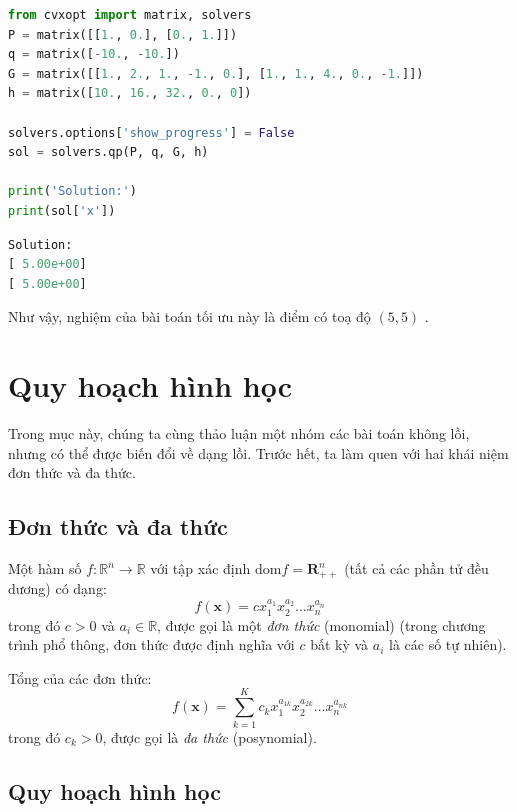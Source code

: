 \newpage
\begin{lstlisting}[language=Python]
from cvxopt import matrix, solvers 
P = matrix([[1., 0.], [0., 1.]]) 
q = matrix([-10., -10.]) 
G = matrix([[1., 2., 1., -1., 0.], [1., 1., 4., 0., -1.]]) 
h = matrix([10., 16., 32., 0., 0]) 
 
solvers.options['show_progress'] = False 
sol = solvers.qp(P, q, G, h) 
 
print('Solution:') 
print(sol['x']) 
\end{lstlisting}
\kq 
\begin{lstlisting}[language=Python]
Solution: 
[ 5.00e+00] 
[ 5.00e+00] 
\end{lstlisting}
Như vậy, nghiệm của bài toán tối ưu này là điểm có toạ độ $(5, 5)$ .
 
\section{Quy hoạch hình học}
Trong mục này, chúng ta cùng thảo luận một nhóm các bài toán {không lồi}, nhưng có thể được biến đổi về
dạng {lồi}. Trước hết, ta
làm quen với hai khái niệm đơn thức và {đa thức}.
 
\subsection{Đơn thức và đa thức}
Một hàm số $f: \mathbb{R}^n \rightarrow \mathbb{R}$ với tập xác định $\text{dom}f = \mathbf{R}_{++}^n$ (tất cả các phần tử đều dương) có dạng:
\begin{equation} 
\label{eqn:17_monomials}
f(\mathbf{x}) = c x_1^{a_1} x_2^{a_2} \dots x_n^{a_n}
\end{equation} 
trong đó $c > 0$ và $a_i \in \mathbb{R}$, được gọi là một \textit{đơn thức} (monomial) (trong chương trình phổ
thông, đơn thức được định nghĩa với $c$ bất kỳ và $a_i$ là các số tự
nhiên).
 
Tổng của các đơn thức:
\begin{equation} 
\label{eqn:17_posy}
f(\mathbf{x}) = \sum_{k=1}^K c_k x_1^{a_{1k}}x_2^{a_{2k}}\dots x_n^{a_{nk}}
\end{equation} 
trong đó $c_k > 0$, được gọi là \textit{đa thức} (posynomial).
 
 
\subsection{Quy hoạch hình học}
     
